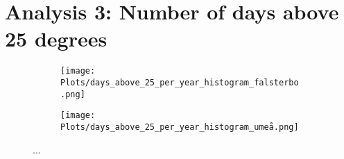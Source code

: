 \section{Analysis 3: Number of days above 25 degrees}

\begin{figure}[H]
    \centering
    \begin{subfigure}[b]{0.49\linewidth}
        \centering
        \texttt{[image: Plots/days\_above\_25\_per\_year\_histogram\_falsterbo.png]}
        \caption{}
        \label{fig:25falsterbo}
    \end{subfigure}
    \begin{subfigure}[b]{0.49\linewidth}
        \centering
        \texttt{[image: Plots/days\_above\_25\_per\_year\_histogram\_umeå.png]}
        \caption{}
        \label{fig:25umea}
    \end{subfigure}
    \caption{...}
    \label{}

\end{figure}
